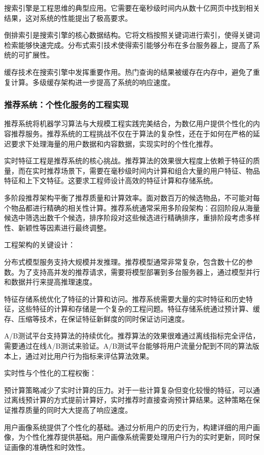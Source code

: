 搜索引擎是工程思维的典型应用。它需要在毫秒级时间内从数十亿网页中找到相关结果，这对系统的性能提出了极高要求。

倒排索引是搜索引擎的核心数据结构。它将文档按照关键词进行索引，使得关键词检索能够快速完成。分布式索引技术使得索引能够分布在多台服务器上，提高了系统的可扩展性。

缓存技术在搜索引擎中发挥重要作用。热门查询的结果被缓存在内存中，避免了重复计算。多级缓存架构进一步提高了系统的响应速度。

\subsubsection{推荐系统：个性化服务的工程实现}

推荐系统将机器学习算法与大规模工程实践完美结合，为数亿用户提供个性化的内容推荐服务。推荐系统的工程挑战不仅在于算法的复杂性，还在于如何在严格的延迟要求下处理海量的用户数据和内容数据，实现实时的个性化推荐。

实时特征工程是推荐系统的核心挑战。推荐算法的效果很大程度上依赖于特征的质量，而在实时推荐场景下，需要在毫秒级时间内计算和组合大量的用户特征、物品特征和上下文特征。这要求工程师设计高效的特征计算和存储系统。

多阶段推荐架构平衡了推荐质量和计算效率。面对数百万的候选物品，不可能对每个物品都进行精确的相关性计算。推荐系统通常采用多阶段架构：召回阶段从海量候选中筛选出数千个候选，排序阶段对这些候选进行精确排序，重排阶段考虑多样性、新颖性等因素进行最终调整。

工程架构的关键设计：

分布式模型服务支持大规模并发推理。推荐模型通常非常复杂，包含数十亿的参数。为了支持高并发的推荐请求，需要将模型部署到多台服务器上，通过模型并行和数据并行来提高推理速度。

特征存储系统优化了特征的计算和访问。推荐系统需要大量的实时特征和历史特征，这些特征的计算和存储是一个复杂的工程问题。特征存储系统通过预计算、缓存、压缩等技术，在保证特征新鲜度的同时保证访问速度。

A/B测试平台支持算法的持续优化。推荐算法的效果很难通过离线指标完全评估，需要通过在线A/B测试来验证。A/B测试平台能够将用户流量分配到不同的算法版本上，通过对比用户行为指标来评估算法效果。

实时性与个性化的工程权衡：

预计算策略减少了实时计算的压力。对于一些计算复杂但变化较慢的特征，可以通过离线预计算的方式提前计算好，实时推荐时直接查询预计算结果。这种策略在保证推荐质量的同时大大提高了响应速度。

用户画像系统提供了个性化的基础。通过分析用户的历史行为，构建详细的用户画像，为个性化推荐提供基础。用户画像系统需要处理用户行为的实时更新，同时保证画像的准确性和时效性。


